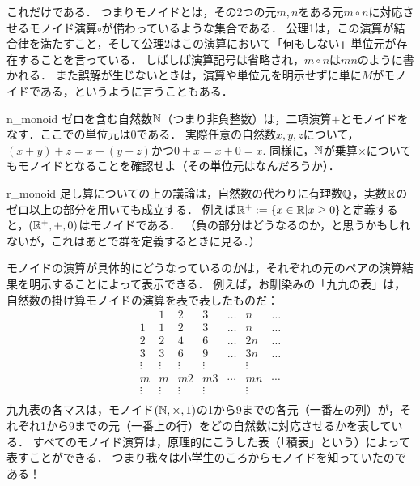 \documentclass[11pt,a4paper, dvipdfmx]{jsarticle}
\begin{document}
これだけである．
つまりモノイドとは，その2つの元$m,n$をある元$m \circ n$に対応させるモノイド演算$\circ$が備わっているような集合である．
公理1は，この演算が結合律を満たすこと，そして公理2はこの演算において「何もしない」単位元が存在することを言っている．
しばしば演算記号は省略され，$m \circ n$は$mn$のように書かれる．
また誤解が生じないときは，演算や単位元を明示せずに単に$M$がモノイドである，というように言うこともある．


\begin{rei}{}{n_monoid}
ゼロを含む自然数$\mathbb{N}$（つまり非負整数）は，二項演算$+$とモノイドをなす．ここでの単位元は$0$である．
実際任意の自然数$x, y, z$について，$(x+y)+z = x + (y+z)$かつ$0 + x = x + 0 = x$. 
同様に，$\mathbb{N}$が乗算$\times$についてもモノイドとなることを確認せよ（その単位元はなんだろうか）．
\end{rei}

\begin{rei}{}{r_monoid}
足し算についての上の議論は，自然数の代わりに有理数$\mathbb{Q}$，実数$\mathbb{R}$のゼロ以上の部分を用いても成立する．
例えば$\mathbb{R}^+ := \{ x \in \mathbb{R} | x \geq 0 \}$と定義すると，$(\mathbb{R}^+, +, 0)$はモノイドである．
（負の部分はどうなるのか，と思うかもしれないが，これはあとで群を定義するときに見る．）
\end{rei}

モノイドの演算が具体的にどうなっているのかは，それぞれの元のペアの演算結果を明示することによって表示できる．
例えば，お馴染みの「九九の表」は，自然数の掛け算モノイドの演算を表で表したものだ：
\[
\begin{array}{c|cccccc}
       & 1 & 2 & 3 & \dots & n & \dots \\ \hline
     1 & 1 & 2 & 3 & \dots & n & \dots \\ 
     2 & 2 & 4 & 6 & \dots & 2n & \dots \\ 
     3 & 3 & 6 & 9 & \dots & 3n & \dots \\ 
     \vdots & \vdots & \vdots & \vdots & & \vdots & \\
     m & m & m2 & m3 & \cdots & mn & \cdots \\
     \vdots & \vdots & \vdots & \vdots & & \vdots & \\
\end{array}
\]
九九表の各マスは，モノイド$(\mathbb{N}, \times, 1)$の1から9までの各元（一番左の列）が，それぞれ1から9までの元（一番上の行）をどの自然数に対応させるかを表している．
すべてのモノイド演算は，原理的にこうした表（「積表」という）によって表すことができる．
つまり我々は小学生のころからモノイドを知っていたのである！
\end{document}
